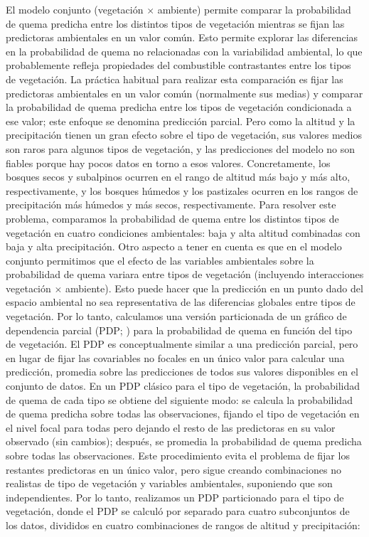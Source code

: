 El modelo conjunto (vegetación $\times$ ambiente) permite comparar la probabilidad de quema predicha entre los distintos tipos de vegetación mientras se fijan las predictoras ambientales en un valor común. Esto permite explorar las diferencias en la probabilidad de quema no relacionadas con la variabilidad ambiental, lo que probablemente refleja propiedades del combustible contrastantes entre los tipos de vegetación. La práctica habitual para realizar esta comparación es fijar las predictoras ambientales en un valor común (normalmente sus medias) y comparar la probabilidad de quema predicha entre los tipos de vegetación condicionada a ese valor; este enfoque se denomina predicción parcial. Pero como la altitud y la precipitación tienen un gran efecto sobre el tipo de vegetación, sus valores medios son raros para algunos tipos de vegetación, y las predicciones del modelo no son fiables porque hay pocos datos en torno a esos valores. Concretamente, los bosques secos y subalpinos ocurren en el rango de altitud más bajo y más alto, respectivamente, y los bosques húmedos y los pastizales ocurren en los rangos de precipitación más húmedos y más secos, respectivamente. Para resolver este problema, comparamos la probabilidad de quema entre los distintos tipos de vegetación en cuatro condiciones ambientales: baja y alta altitud combinadas con baja y alta precipitación. 
Otro aspecto a tener en cuenta es que en el modelo conjunto permitimos que el efecto de las variables ambientales sobre la probabilidad de quema variara entre tipos de vegetación (incluyendo interacciones vegetación $\times$ ambiente). Esto puede hacer que la predicción en un punto dado del espacio ambiental no sea representativa de las diferencias globales entre tipos de vegetación. Por lo tanto, calculamos una versión particionada de un gráfico de dependencia parcial (PDP; \citealt{greenwell2017pdp}) para la probabilidad de quema en función del tipo de vegetación. El PDP es conceptualmente similar a una predicción parcial, pero en lugar de fijar las covariables no focales en un único valor para calcular una predicción, promedia sobre las predicciones de todos sus valores disponibles en el conjunto de datos. En un PDP clásico para el tipo de vegetación, la probabilidad de quema de cada tipo se obtiene del siguiente modo: se calcula la probabilidad de quema predicha sobre todas las observaciones, fijando el tipo de vegetación en el nivel focal para todas pero dejando el resto de las predictoras en su valor observado (sin cambios); después, se promedia la probabilidad de quema predicha sobre todas las observaciones. Este procedimiento evita el problema de fijar los restantes predictoras en un único valor, pero sigue creando combinaciones no realistas de tipo de vegetación y variables ambientales, suponiendo que son independientes. Por lo tanto, realizamos un PDP particionado para el tipo de vegetación, donde el PDP se calculó por separado para cuatro subconjuntos de los datos, divididos en cuatro combinaciones de rangos de altitud y precipitación:

